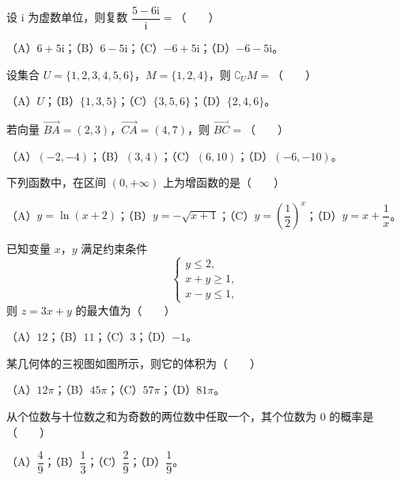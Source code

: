\begin{question}
设 $\mathrm i$ 为虚数单位，则复数 $\dfrac{5-6\mathrm i}{\mathrm i}=$\mbox{（　　）}

（A）$6+5\mathrm i$；（B）$6-5\mathrm i$；（C）$-6+5\mathrm i$；（D）$-6-5\mathrm i$。

\end{question}
\begin{question}
设集合 $U=\{1,2,3,4,5,6\}$，$M=\{1,2,4\}$，则 $\complement_U M=$\mbox{（　　）}

（A）$U$；（B）$\{1,3,5\}$；（C）$\{3,5,6\}$；（D）$\{2,4,6\}$。

\end{question}
\begin{question}
若向量 $\overrightarrow{BA}=(2,3)$，$\overrightarrow{CA}=(4,7)$，则 $\overrightarrow{BC}=$\mbox{（　　）}

（A）$(-2,-4)$；（B）$(3,4)$；（C）$(6,10)$；（D）$(-6,-10)$。

\end{question}
\begin{question}
下列函数中，在区间 $(0,+\infty)$ 上为增函数的是\mbox{（　　）}

（A）$y=\ln(x+2)$；（B）$y=-\sqrt{x+1}$；（C）$y=\left(\dfrac12\right)^x$；（D）$y=x+\dfrac1x$。

\end{question}
\begin{question}
已知变量 $x$，$y$ 满足约束条件
\nopagebreak[4]
\[\begin{cases}
y\leqslant 2,\\
x+y\geqslant 1,\\
x-y\leqslant 1,
\end{cases}\]
则 $z=3x+y$ 的最大值为\mbox{（　　）}

（A）$12$；（B）$11$；（C）$3$；（D）$-1$。

\Needspace{0.4\textheight}
\end{question}
\begin{question}
某几何体的三视图如图所示，则它的体积为\mbox{（　　）}
\nopagebreak[4]
\begin{center}\end{center}
\nopagebreak[4]
（A）$12\pi$；（B）$45\pi$；（C）$57\pi$；（D）$81\pi$。

\end{question}
\begin{question}
从个位数与十位数之和为奇数的两位数中任取一个，其个位数为 $0$ 的概率是\mbox{（　　）}

（A）$\dfrac49$；（B）$\dfrac13$；（C）$\dfrac29$；（D）$\dfrac19$。

\end{question}
